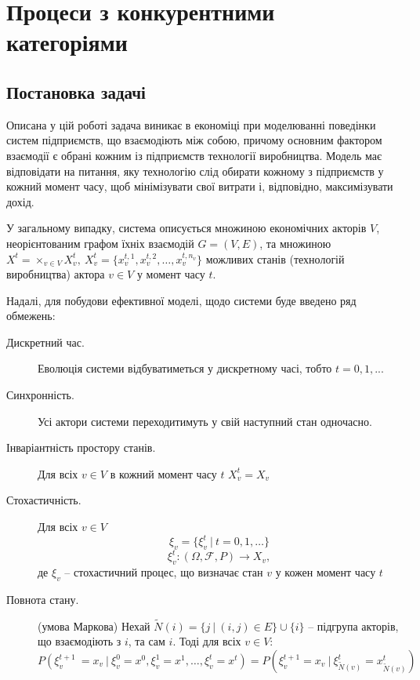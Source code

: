 \documentclass[oneside,draft,14pt]{extarticle}
\begin{document}

\setcounter{page}{2}

\tableofcontents
\clearpage

\section{Процеси з конкурентними категоріями}

\subsection{Постановка задачі}

Описана у цій роботі задача виникає в економіці\cite{David:1998} при моделюванні поведінки систем підприємств, що взаємодіють між собою, причому основним фактором взаємодії є обрані кожним із підприємств технології виробництва. Модель має відповідати на питання, яку технологію слід обирати кожному з підприємств у кожний момент часу, щоб мінімізувати свої витрати і, відповідно, максимізувати дохід. 

У загальному випадку, система описується\cite{Chornei:2005} множиною економічних акторів \(V\), неорієнтованим графом їхніх взаємодій \(G = (V, E)\), та множиною \(X^t = \times_{v \in V}X_v^t,\ X_v^t = \{x^{t,1}_v, x^{t,2}_v, \ldots, x^{t,n_v}_v\}\) можливих станів (технологій виробництва) актора \(v \in V\) у момент часу \(t\).

Надалі, для побудови ефективної моделі, щодо системи буде введено ряд обмежень:
\begin{description} 
	\item[Дискретний час.] Еволюція системи відбуватиметься у дискретному часі, тобто \(t = 0, 1, ...\)
	\item[Синхронність.] Усі актори системи переходитимуть у свій наступний стан одночасно.
	\item[Інваріантність простору станів.] Для всіх \(v \in V\) в кожний момент часу \(t\) \(X_v^t = X_v\)
	\item[Стохастичність.] Для всіх \(v \in V\)
	\[ \xi_v = \{\xi^t_v\ |\ t = 0, 1, \ldots \}\] \[ \xi_v^t : (\Omega, \mathcal{F}, P) \rightarrow X_v,\] 
	де \( \xi_v \) – стохастичний процес, що визначає стан \(v\) у кожен момент часу \(t\)
	\item[Повнота стану.] (умова Маркова) Нехай \(\tilde N(i) = \{j\ |\ (i, j) \in E \} \cup \{i\} \) – підгрупа акторів, що взаємодіють з \(i\), та сам \(i\). Тоді для всіх \(v \in V\):
	\[P(\xi_v^{t+1}\ = x_v\ |\ \xi_v^0 = x^0, \xi_v^1 = x^1, \ldots, \xi_v^t = x^t) = P(\xi_v^{t+1} = x_v\ |\ \xi_{\tilde N(v)}^t = x_{\tilde N(v)}^t )\]
\end{description}
\end{document}
